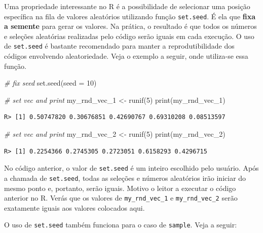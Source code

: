 \documentclass[
  11pt,
]{book}
\newenvironment{Shaded}{\begin{snugshade}}{\end{snugshade}}
\newcommand{\AttributeTok}[1]{\textcolor[rgb]{0.61,0.61,0.61}{#1}}
\newcommand{\CommentTok}[1]{\textcolor[rgb]{0.37,0.37,0.37}{\textit{#1}}}
\newcommand{\DecValTok}[1]{\textcolor[rgb]{0.06,0.06,0.06}{#1}}
\newcommand{\FunctionTok}[1]{\textcolor[rgb]{0,0,0}{#1}}
\newcommand{\NormalTok}[1]{#1}
\newcommand{\OtherTok}[1]{\textcolor[rgb]{0.37,0.37,0.37}{#1}}
\begin{document}
Uma propriedade interessante no R é a possibilidade de selecionar uma posição específica na fila de valores aleatórios utilizando função \texttt{set.seed}. É ela que \textbf{fixa a semente} para gerar os valores. Na prática, o resultado é que todos os números e seleções aleatórias realizadas pelo código serão iguais em cada execução. O uso de \texttt{set.seed} é bastante recomendado para manter a reprodutibilidade dos códigos envolvendo aleatoriedade. Veja o exemplo a seguir, onde utiliza-se essa função. 

\begin{Shaded}
\begin{Highlighting}[]
\CommentTok{\# fix seed}
\FunctionTok{set.seed}\NormalTok{(}\AttributeTok{seed =} \DecValTok{10}\NormalTok{)}

\CommentTok{\# set vec and print}
\NormalTok{my\_rnd\_vec\_1 }\OtherTok{\textless{}{-}} \FunctionTok{runif}\NormalTok{(}\DecValTok{5}\NormalTok{)}
\FunctionTok{print}\NormalTok{(my\_rnd\_vec\_1)}
\end{Highlighting}
\end{Shaded}

\begin{verbatim}
R> [1] 0.50747820 0.30676851 0.42690767 0.69310208 0.08513597
\end{verbatim}

\begin{Shaded}
\begin{Highlighting}[]
\CommentTok{\# set vec and print}
\NormalTok{my\_rnd\_vec\_2 }\OtherTok{\textless{}{-}} \FunctionTok{runif}\NormalTok{(}\DecValTok{5}\NormalTok{)}
\FunctionTok{print}\NormalTok{(my\_rnd\_vec\_2)}
\end{Highlighting}
\end{Shaded}

\begin{verbatim}
R> [1] 0.2254366 0.2745305 0.2723051 0.6158293 0.4296715
\end{verbatim}

No código anterior, o valor de \texttt{set.seed} é um inteiro escolhido pelo usuário. Após a chamada de \texttt{set.seed}, todas as seleções e números aleatórios irão iniciar do mesmo ponto e, portanto, serão iguais. Motivo o leitor a executar o código anterior no R. Verás que os valores de \texttt{my\_rnd\_vec\_1} e \texttt{my\_rnd\_vec\_2} serão exatamente iguais aos valores colocados aqui.

O uso de \texttt{set.seed} também funciona para o caso de \texttt{sample}. Veja a seguir:
\end{document}
